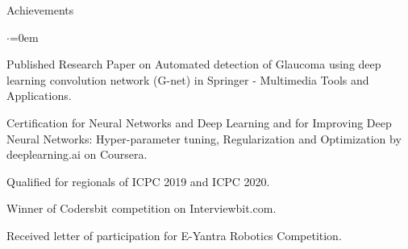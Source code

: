 \documentclass{resume} %
\begin{document}
    \begin{rSection}{Achievements}
        \begin{list}{$\cdot$}{\leftmargin=0em}
        
            \itemsep -6pt
                \item Published Research Paper on Automated detection of Glaucoma using deep learning convolution network (G-net) in Springer - Multimedia Tools and Applications.
                \item Certification for Neural Networks and Deep Learning and for Improving Deep Neural Networks: Hyper-parameter tuning, Regularization and Optimization by deeplearning.ai on Coursera.
                \item Qualified for regionals of ICPC 2019 and ICPC 2020.
                \item Winner of Codersbit competition on Interviewbit.com.
                \item Received letter of participation for E-Yantra Robotics Competition.

        \end{list}

    \end{rSection}
\end{document}
